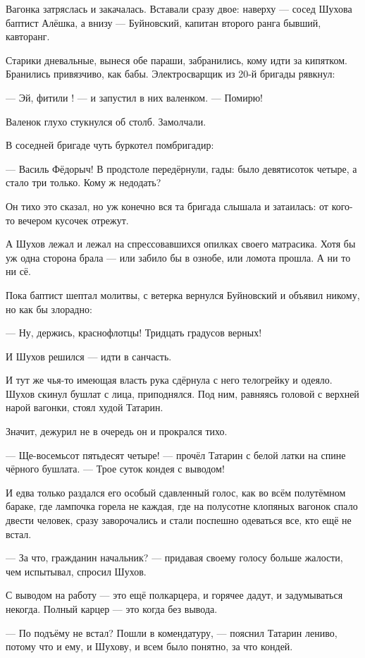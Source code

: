 Вагонка затряслась и закачалась. Вставали сразу двое: наверху --- сосед Шухова баптист
Алёшка, а внизу --- Буйновский, капитан второго ранга бывший, кавторанг.

Старики дневальные, вынеся обе параши, забранились, кому идти за кипятком. Бранились
привязчиво, как бабы. Электросварщик из 20-й бригады рявкнул:

--- Эй, фитили ! --- и запустил в них валенком. --- Помирю!

Валенок глухо стукнулся об столб. Замолчали.

В соседней бригаде чуть буркотел помбригадир:

--- Василь Фёдорыч! В продстоле передёрнули, гады: было девятисоток четыре, а стало три только.
Кому ж недодать?

Он тихо это сказал, но уж конечно вся та бригада слышала и затаилась: от кого-то вечером
кусочек отрежут.

А Шухов лежал и лежал на спрессовавшихся опилках своего матрасика. Хотя бы уж одна сторона
брала --- или забило бы в ознобе, или ломота прошла. А ни то ни сё.

Пока баптист шептал молитвы, с ветерка вернулся Буйновский и объявил никому, но как бы
злорадно:

--- Ну, держись, краснофлотцы! Тридцать градусов верных!

И Шухов решился --- идти в санчасть.

И тут же чья-то имеющая власть рука сдёрнула с него телогрейку и одеяло. Шухов скинул бушлат
с лица, приподнялся. Под ним, равняясь головой с верхней нарой вагонки, стоял худой Татарин.

Значит, дежурил не в очередь он и прокрался тихо.

--- Ще-восемьсот пятьдесят четыре! --- прочёл Татарин с белой латки на спине чёрного бушлата. ---
Трое суток кондея с выводом!

И едва только раздался его особый сдавленный голос, как во всём полутёмном бараке, где
лампочка горела не каждая, где на полусотне клопяных вагонок спало двести человек, сразу
заворочались и стали поспешно одеваться все, кто ещё не встал.

--- За что, гражданин начальник? --- придавая своему голосу больше жалости, чем испытывал,
спросил Шухов.

С выводом на работу --- это ещё полкарцера, и горячее дадут, и задумываться некогда. Полный
карцер --- это когда без вывода.

--- По подъёму не встал? Пошли в комендатуру, --- пояснил Татарин лениво, потому что и ему, и
Шухову, и всем было понятно, за что кондей.


